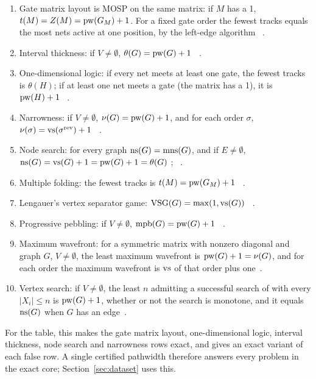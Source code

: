 \begin{theorem}\label{thm:core}
\leavevmode
\begin{enumerate}
\item Gate matrix layout is MOSP on the same matrix: if $M$ has a 1,
  $t(M)=Z(M)=\mathrm{pw}(G_M)+1$. For a fixed gate order the fewest tracks equals the
  most nets active at one position, by the left-edge algorithm
  \citep[p.~31]{LY2002ref6}~.
\item Interval thickness: if $V\ne\emptyset$, $\theta(G)=\mathrm{pw}(G)+1$
  \citep[Prop.~3.5]{LY2002ref6}~.
\item One-dimensional logic: if every net meets at least one gate, the
  fewest tracks is $\theta(H)$; if at least one net meets a gate (the matrix
  has a 1), it is $\mathrm{pw}(H)+1$
  \citep[Thm~3]{LY2002ref7}~.
\item Narrowness: if $V\ne\emptyset$, $\nu(G)=\mathrm{pw}(G)+1$, and for each order
  $\sigma$, $\nu(\sigma)=\mathrm{vs}(\sigma^{\mathrm{rev}})+1$
  \citep[Prop.~3.1]{LY2002ref11}~.
\item Node search: for every graph $\mathrm{ns}(G)=\mathrm{mns}(G)$, and if $E\ne\emptyset$,
  $\mathrm{ns}(G)=\mathrm{vs}(G)+1=\mathrm{pw}(G)+1=\theta(G)$
  \citep[Thm]{LY2002ref9}; \citep[Thms~2.3, 4.1]{LY2002ref10}~.
\item Multiple folding: the fewest tracks is $t(M)=\mathrm{pw}(G_M)+1$
  \citep[Thm~3.14]{LY2002ref6}~.
\item Lengauer's vertex separator game: $\mathrm{VSG}(G)=\max(1,\mathrm{vs}(G))$
  \citep[Thm~4]{LY2002ref14}~.
\item Progressive pebbling: if $V\ne\emptyset$, $\mathrm{mpb}(G)=\mathrm{pw}(G)+1$
  \citep[Thm~3.1]{LY2002ref10}~.
\item Maximum wavefront: for a symmetric matrix with nonzero diagonal and graph
  $G$, $V\ne\emptyset$, the least maximum wavefront is $\mathrm{pw}(G)+1=\nu(G)$, and
  for each order the maximum wavefront is $\mathrm{vs}$ of that order plus
  one~.
\item Vertex search: if $V\ne\emptyset$, the least $n$ admitting a successful
  search of \citet[\S5]{BRST1991} with every $|X_i|\le n$ is $\mathrm{pw}(G)+1$,
  whether or not the search is monotone, and it equals $\mathrm{ns}(G)$ when $G$ has an
  edge~.
\end{enumerate}
\end{theorem}
For the table, this makes the gate matrix layout, one-dimensional logic,
interval thickness, node search and narrowness rows exact, and gives an exact
variant of each false row. A single certified pathwidth therefore answers
every problem in the exact core; Section~\ref{sec:dataset} uses this.

